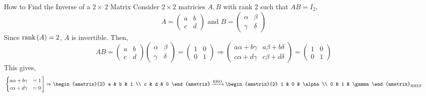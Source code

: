 \begin{impbox}{How to Find the Inverse of a $2\times\,2$ Matrix}{}
    Consider $2 \times 2$ matricies $A, B$ with rank $2$ such that $AB=I_2$,
    \[
        A = \begin{pmatrix}
            a & b \\ c & d
        \end{pmatrix} 
        \text{ and }
        B = \begin{pmatrix}
            \alpha & \beta \\ \gamma & \delta
        \end{pmatrix}
    \]
    Since $\text{rank}\left(A\right)=2$, $A$ is invertible. Then,
    \[
        AB = 
        \begin{pmatrix}
            a & b \\ c & d
        \end{pmatrix} 
        \begin{pmatrix}
            \alpha & \beta \\ \gamma & \delta
        \end{pmatrix}
        = \begin{pmatrix}
            1 & 0 \\ 0 & 1 
        \end{pmatrix}
        \Rightarrow
        \begin{pmatrix}
            a\alpha + b\gamma & a\beta + b\delta \\
            c\alpha + d\gamma & c\beta + d\delta 
        \end{pmatrix}
        = 
        \begin{pmatrix}
            1 & 0 \\ 0 & 1
        \end{pmatrix}
    \]
    This gives, 
    \[
        \left.\begin{cases}
            a\alpha + b\gamma &= 1 \\
            c\alpha + d\gamma &= 0
        \end{cases}\right]
        \Rightarrow
        \begin{amatrix}{2}
            a & b & 1 \\ 
            c & d & 0
        \end{amatrix}
        \xrightarrow{\text{ERO}}
        \begin{amatrix}{2}
            1 & 0 & \alpha \\
            0 & 1 & \gamma
        \end{amatrix}_{\text{RREF}}
    \]
    \[
\]
\end{impbox}
